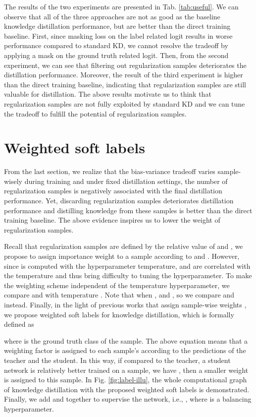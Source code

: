 \documentclass{article} \usepackage{iclr2021_conference,times}
\begin{document}
The results of the two experiments are presented in Tab. \ref{tab:useful}. We can observe that all of the three approaches are not as good as the baseline knowledge distillation performance, but are better than the direct training baseline. 
First, since masking  loss on the label related logit results in worse performance compared to standard KD, we cannot resolve the tradeoff by applying a mask on the ground truth related logit.
Then, from the second experiment, we can see that filtering out regularization samples deteriorates the distillation performance. Moreover, the result of the third experiment is higher than the direct training baseline, indicating that regularization samples are still valuable for distillation. The above results motivate us to think that regularization samples are not fully exploited by standard KD and we can tune the tradeoff to fulfill the potential of regularization samples.





\vspace{-5pt}
\section{Weighted soft labels}
\vspace{-5pt}
From the last section, we realize that the bias-variance tradeoff varies sample-wisely during training and under fixed distillation settings, the number of regularization samples is negatively associated with the final distillation performance. 
Yet, discarding regularization samples deteriorates distillation performance and distilling knowledge from these samples is better than the direct training baseline. 
The above evidence inspires us to lower the weight of regularization samples. 


Recall that regularization samples are defined by the relative value of  and , we propose to assign importance weight to a sample according to  and . 
However, since  is computed with the hyperparameter temperature,  and  are correlated with the temperature and thus bring difficulty to tuning the hyperparameter. 
To make the weighting scheme independent of the temperature hyperparameter, we compare  and  with temperature . Note that when ,  and , so we compare  and  instead. 
Finally, in the light of previous works that assign sample-wise weights \citep{lin2017focal,tang2019learning}, we propose weighted soft labels for knowledge distillation, which is formally defined as

where  is the ground truth class of the sample.
The above equation means that a weighting factor is assigned to each sample's  according to the predictions of the teacher and the student. 
In this way, if compared to the teacher, a student network is relatively better trained on a sample, we have , then a smaller weight is assigned to this sample.
In Fig. \ref{fig:label-illu}, the whole computational graph of knowledge distillation with the proposed weighted soft labels is demonstrated. 
Finally, we add  and  together to supervise the network, i.e., , where  is a balancing hyperparameter.
\end{document}
